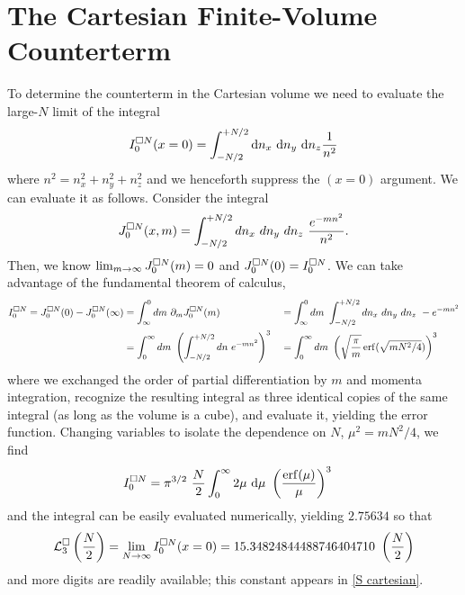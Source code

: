 \section{The Cartesian \Luscher Finite-Volume Counterterm}\label{sec:counterterm/cartesian}

To determine the counterterm in the Cartesian volume we need to evaluate the large-$N$ limit of the integral
\begin{equation}
	I^{\square N}_0(x=0) = \int_{-N/2}^{+N/2} \mathrm{d}n_x\ \mathrm{d}n_y\ \mathrm{d}n_z \frac{1}{n^2}
\end{equation}
where $n^2 = n_x^2+n_y^2+n_z^2$ and we henceforth suppress the $(x=0)$ argument.
We can evaluate it as follows.  Consider the integral
\begin{equation}
	J^{\square N}_0(x, m) = \int_{-N/2}^{+N/2} dn_x\ dn_y\ dn_z\ \frac{e^{-m n^2}}{n^2}.
\end{equation}
Then, we know $\lim_{m\rightarrow\infty} J^{\square N}_0(m) = 0$ and $J^{\square N}_0(0) = I^{\square N}_0$.
We can take advantage of the fundamental theorem of calculus,
\begin{align}
	I^{\square N}_0 = J^{\square N}_0(0) - J^{\square N}_0(\infty)
		&= 	\int_{\infty}^{0} dm\ \partial_m J^{\square N}_0(m)
		&&=	\int_{\infty}^{0} dm\ \int_{-N/2}^{+N/2} dn_x\ dn_y\ dn_z\ -e^{-m n^2}
		\nonumber\\
		&=	\int_0^\infty dm\ \left(\int_{-N/2}^{+N/2} dn\ e^{-m n^2}\right)^3
		&&=	\int_0^\infty dm\ \left(\sqrt{\frac{\pi}{m}} \operatorname{erf}(\sqrt{m N^2/4})\right)^3
\end{align}
where we exchanged the order of partial differentiation by $m$ and momenta integration, recognize the resulting integral as three identical copies of the same integral (as long as the volume is a cube), and evaluate it, yielding the error function.
Changing variables to isolate the dependence on $N$, $\mu^2 = m N^2/4$, we find
\begin{align}
    I^{\square N}_0
    &=
    \pi^{3/2}\ \frac{N}{2} \int_{0}^\infty 2\mu\ \mathrm{d}\mu\ \left(\frac{\operatorname{erf}(\mu)}{\mu}\right)^3
\end{align}
and the integral can be easily evaluated numerically, yielding $2.75634$ so that
\begin{equation}
    \mathcal{L}^\square_3 \left(\frac{N}{2}\right) = \lim_{N\rightarrow\infty}I^{\square N}_0(x=0) = 15.34824844488746404710\ \left(\frac{N}{2}\right)
\end{equation}
and more digits are readily available; this constant appears in \eqref{S cartesian}.

